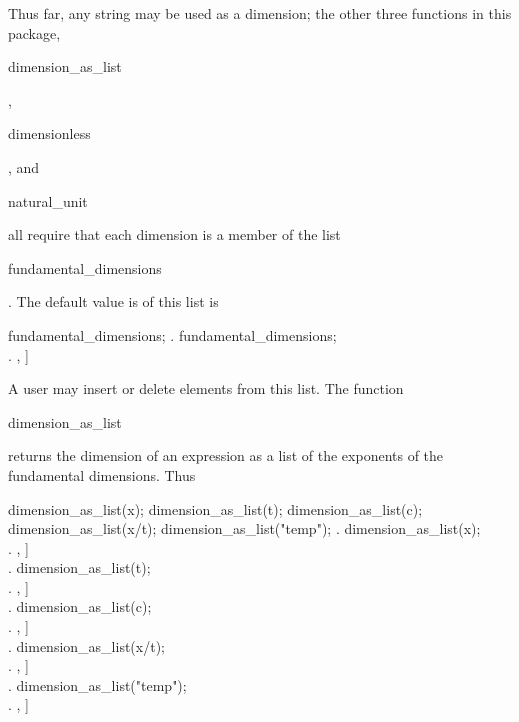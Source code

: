 Thus far, any string may be used as a dimension; the other
three functions in this package, 
\begin{verb} dimension_as_list  \end{verb}, 
\begin{verb} dimensionless \end{verb}, and
\begin{verb} natural_unit \end{verb} all require that each
dimension is a member of  the list 
\begin{verb} fundamental_dimensions \end{verb}. The default value  is of 
this list is

\beginmaximasession
fundamental_dimensions;
\maximatexsession
{}.  fundamental_dimensions; \\
.  \left[ \mathrm{mass},\linebreak[0],\linebreak[0] \right] \\
\endmaximasession

\noindent A user may insert or delete elements from this list.
The function \begin{verb} dimension_as_list \end{verb} returns the dimension
of an expression as a list of the exponents of the
fundamental dimensions. Thus

\beginmaximasession
dimension_as_list(x);
dimension_as_list(t);
dimension_as_list(c);
dimension_as_list(x/t);
dimension_as_list("temp");
\maximatexsession
{}.  dimension_as_list(x); \\
.  \left[ 0,\linebreak[0]1, \right] \\
.  dimension_as_list(t); \\
.  \left[ 0,\linebreak[0]0, \right] \\
.  dimension_as_list(c); \\
.  \left[ 0,\linebreak[0]1, \right] \\
.  dimension_as_list(x/t); \\
.  \left[ 0,\linebreak[0]1, \right] \\
.  dimension_as_list("temp"); \\
.  \left[ 0,\linebreak[0]0, \right] \\
\endmaximasession

